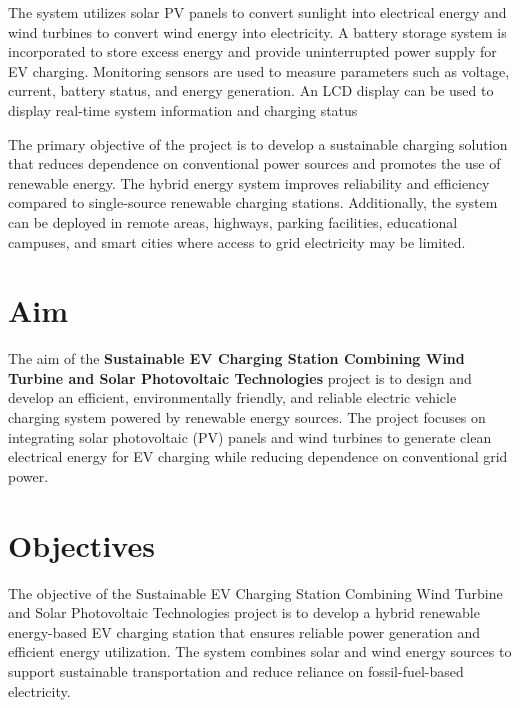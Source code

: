 \documentclass[12pt]{report}
\begin{document}
\begin{Certificatepage}
\begin{center}
\begin{justify}
\vspace{10pt} %

The system utilizes solar PV panels to convert sunlight into electrical energy and wind turbines to convert wind energy into electricity. A battery storage system is incorporated to store excess energy and provide uninterrupted power supply for EV charging. Monitoring sensors are used to measure parameters such as voltage, current, battery status, and energy generation. An LCD display can be used to display real-time system information and charging status

\vspace{10pt} %

The primary objective of the project is to develop a sustainable charging solution that reduces dependence on conventional power sources and promotes the use of renewable energy. The hybrid energy system improves reliability and efficiency compared to single-source renewable charging stations. Additionally, the system can be deployed in remote areas, highways, parking facilities, educational campuses, and smart cities where access to grid electricity may be limited.

 


\setlength{\parindent}{15pt} %

\newpage
\section{Aim}


The aim of the \textbf{Sustainable EV Charging Station Combining Wind Turbine and Solar Photovoltaic Technologies} project is to design and develop an efficient, environmentally friendly, and reliable electric vehicle charging system powered by renewable energy sources. The project focuses on integrating solar photovoltaic (PV) panels and wind turbines to generate clean electrical energy for EV charging while reducing dependence on conventional grid power.

\vspace{10pt} %

\section{Objectives}
The objective of the Sustainable EV Charging Station Combining Wind Turbine and Solar Photovoltaic Technologies project is to develop a hybrid renewable energy-based EV charging station that ensures reliable power generation and efficient energy utilization. The system combines solar and wind energy sources to support sustainable transportation and reduce reliance on fossil-fuel-based electricity.


\end{justify}
\end{center}
\end{Certificatepage}
\end{document}
